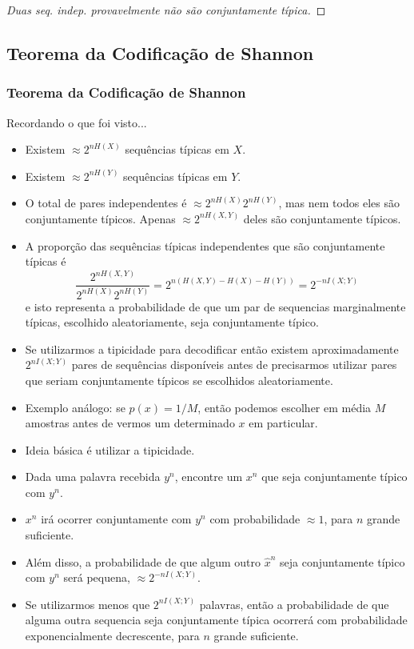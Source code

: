 \begin{frame}[allowframebreaks]
\begin{proof}[Duas seq. indep. provavelmente não são conjuntamente típica]
  \end{proof}

\end{frame}

\subsection{Teorema da Codificação de Shannon}
\begin{frame}[allowframebreaks]
  \frametitle{Teorema da Codificação de Shannon}
  Recordando o que foi visto...
  \begin{itemize}
  \item Existem $\approx 2^{nH(X)}$ sequências típicas em $X$.
  \item Existem $\approx 2^{nH(Y)}$ sequências típicas em $Y$.
  \item O total de pares independentes é $\approx 2^{nH(X)} 2^{nH(Y)}$, mas 
	nem todos eles são conjuntamente típicos. Apenas $\approx 2^{nH(X,Y)}$ deles
	são conjuntamente típicos. 
  \item A proporção das sequências típicas independentes que são conjuntamente típicas é
	\begin{equation}
	\frac{2^{nH(X,Y)}}{2^{nH(X)} 2^{nH(Y)}} = 2^{n(H(X,Y) - H(X) - H(Y))} = 2^{-nI(X;Y)}
	\end{equation}
	e isto representa a probabilidade de que um par de sequencias marginalmente típicas, escolhido aleatoriamente, 
	seja conjuntamente típico.
  \item Se utilizarmos a tipicidade para decodificar então existem aproximadamente $2^{nI(X;Y)}$ pares de sequências
	disponíveis antes de precisarmos utilizar pares que seriam conjuntamente típicos se escolhidos aleatoriamente.
  \item Exemplo análogo: se $p(x) = 1/M$, então podemos escolher em média $M$ amostras antes de vermos um determinado $x$ em particular.
  \end{itemize}

  \framebreak

  \begin{itemize}
  \item Ideia básica é utilizar a tipicidade.
  \item Dada uma palavra recebida $y^n$, encontre um $x^n$ que seja conjuntamente típico com $y^n$.
  \item $x^n$ irá ocorrer conjuntamente com $y^n$ com probabilidade $\approx 1$, para $n$ grande suficiente. 
  \item Além disso, a probabilidade de que algum outro $\hat{x}^n$ seja conjuntamente típico com $y^n$ será
	pequena, $\approx 2^{-nI(X;Y)}$.
  \item Se utilizarmos menos que $2^{nI(X;Y)}$ palavras, então a probabilidade de que alguma outra
	sequencia seja conjuntamente típica ocorrerá com probabilidade exponencialmente decrescente, para $n$ grande suficiente. 
  \end{itemize}



\end{frame}
